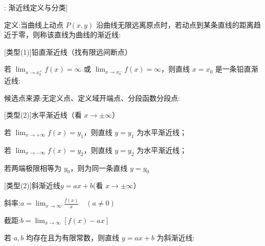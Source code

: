 \documentclass[11pt,a4paper,UTF8]{ctexart}
\begin{document}
\begin{thmbox}[原理[1]: 渐近线定义与分类]

定义:当曲线上动点 $P(x, y)$ 沿曲线无限远离原点时，若动点到某条直线的距离趋近于零，则称该直线为曲线的渐近线:

[类型(1)]铅直渐近线（找有限远间断点）

  若 $\lim_{x \to x_0^+} f(x) = \infty$ 或 $\lim_{x \to x_0^-} f(x) = \infty$，则直线 \textit{}$x = x_0$\textit{} 是一条铅直渐近线:

  候选点来源:无定义点、定义域开端点、分段函数分段点:

[类型(2)]水平渐近线（看 $x \to \pm\infty$）

  若 $\lim_{x \to +\infty} f(x) = y_1$，则直线 \textit{}$y = y_1$\textit{} 为水平渐近线；

  若 $\lim_{x \to -\infty} f(x) = y_2$，则直线 \textit{}$y = y_2$\textit{} 为水平渐近线；

  若两端极限相等为 $y_0$，则为同一条直线 $y = y_0$

[类型(2)]斜渐近线$y = ax + b$(看 $x \to \pm\infty$）

  斜率:$a = \lim_{x \to \infty} \frac{f(x)}{x} \quad (a \neq 0)$

  截距:$b = \lim_{x \to \infty}[f(x) - ax]$

  若 $a, b$ 均存在且为有限常数，则直线 \textit{}$y = ax + b$\textit{} 为斜渐近线:

\end{thmbox}
\end{document}
